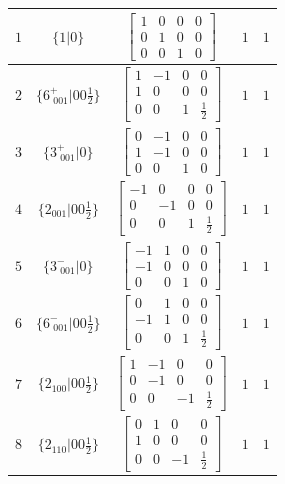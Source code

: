 \documentclass[fleqn,8pt]{jsarticle}
\begin{document}
\begin{longtable}{ccccc}
$ 1 $ & $ \{1|0\} $ & $ \begin{bmatrix} 1 & 0 & 0 & 0 \\ 0 & 1 & 0 & 0 \\ 0 & 0 & 1 & 0 \end{bmatrix} $ & $ 1 $ & $ 1 $ \\ \hline
$ 2 $ & $ \{6^{+}_{\,\,001}|0 0 \frac{1}{2}\} $ & $ \begin{bmatrix} 1 & -1 & 0 & 0 \\ 1 & 0 & 0 & 0 \\ 0 & 0 & 1 & \frac{1}{2} \end{bmatrix} $ & $ 1 $ & $ 1 $ \\ \hline
$ 3 $ & $ \{3^{+}_{\,\,001}|0\} $ & $ \begin{bmatrix} 0 & -1 & 0 & 0 \\ 1 & -1 & 0 & 0 \\ 0 & 0 & 1 & 0 \end{bmatrix} $ & $ 1 $ & $ 1 $ \\ \hline
$ 4 $ & $ \{2{}_{001}|0 0 \frac{1}{2}\} $ & $ \begin{bmatrix} -1 & 0 & 0 & 0 \\ 0 & -1 & 0 & 0 \\ 0 & 0 & 1 & \frac{1}{2} \end{bmatrix} $ & $ 1 $ & $ 1 $ \\ \hline
$ 5 $ & $ \{3^{-}_{\,\,001}|0\} $ & $ \begin{bmatrix} -1 & 1 & 0 & 0 \\ -1 & 0 & 0 & 0 \\ 0 & 0 & 1 & 0 \end{bmatrix} $ & $ 1 $ & $ 1 $ \\ \hline
$ 6 $ & $ \{6^{-}_{\,\,001}|0 0 \frac{1}{2}\} $ & $ \begin{bmatrix} 0 & 1 & 0 & 0 \\ -1 & 1 & 0 & 0 \\ 0 & 0 & 1 & \frac{1}{2} \end{bmatrix} $ & $ 1 $ & $ 1 $ \\ \hline
$ 7 $ & $ \{2{}_{100}|0 0 \frac{1}{2}\} $ & $ \begin{bmatrix} 1 & -1 & 0 & 0 \\ 0 & -1 & 0 & 0 \\ 0 & 0 & -1 & \frac{1}{2} \end{bmatrix} $ & $ 1 $ & $ 1 $ \\ \hline
$ 8 $ & $ \{2{}_{110}|0 0 \frac{1}{2}\} $ & $ \begin{bmatrix} 0 & 1 & 0 & 0 \\ 1 & 0 & 0 & 0 \\ 0 & 0 & -1 & \frac{1}{2} \end{bmatrix} $ & $ 1 $ & $ 1 $ \\ \hline

\end{longtable}
\end{document}
